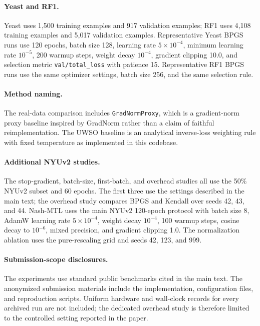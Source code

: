 \paragraph{Yeast and RF1.}
Yeast uses 1{,}500 training examples and 917 validation examples; RF1 uses 4{,}108 training examples and 5{,}017 validation examples. Representative Yeast BPGS runs use 120 epochs, batch size 128, learning rate $5\times 10^{-4}$, minimum learning rate $10^{-5}$, 200 warmup steps, weight decay $10^{-4}$, gradient clipping 10.0, and selection metric \texttt{val/total\_loss} with patience 15. Representative RF1 BPGS runs use the same optimizer settings, batch size 256, and the same selection rule.

\paragraph{Method naming.}
The real-data comparison includes \texttt{GradNormProxy}, which is a gradient-norm proxy baseline inspired by GradNorm rather than a claim of faithful reimplementation. The UWSO baseline is an analytical inverse-loss weighting rule with fixed temperature as implemented in this codebase.

\paragraph{Additional NYUv2 studies.}
The stop-gradient, batch-size, first-batch, and overhead studies all use the 50\% NYUv2 subset
and 60 epochs. The first three use the settings described in the main text; the overhead study
compares BPGS and Kendall over seeds 42, 43, and 44. Nash-MTL uses the main NYUv2 120-epoch
protocol with batch size 8, AdamW learning rate $5\times10^{-4}$, weight decay $10^{-4}$, 100
warmup steps, cosine decay to $10^{-6}$, mixed precision, and gradient clipping 1.0. The
normalization ablation uses the pure-rescaling grid and seeds 42, 123, and 999.

\paragraph{Submission-scope disclosures.}
The experiments use standard public benchmarks cited in the main text. The anonymized submission
materials include the implementation, configuration files, and reproduction scripts. Uniform
hardware and wall-clock records for every archived run are not included; the dedicated overhead
study is therefore limited to the controlled setting reported in the paper.
